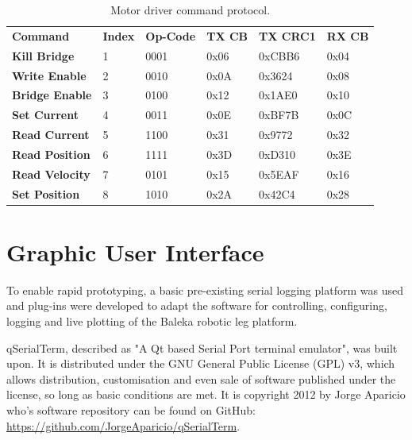 \begin{table}
\centering
\begin{tabular}{llllll}
\textbf{Command}       & \textbf{Index} & \textbf{Op-Code} & \textbf{TX CB} & \textbf{TX CRC1} & \textbf{RX  CB} \\
\textbf{Kill Bridge}   & 1              & 0001             & 0x06           & 0xCBB6           & 0x04            \\
\textbf{Write Enable}  & 2              & 0010             & 0x0A           & 0x3624           & 0x08            \\
\textbf{Bridge Enable} & 3              & 0100             & 0x12           & 0x1AE0           & 0x10            \\
\textbf{Set Current}   & 4              & 0011             & 0x0E           & 0xBF7B           & 0x0C            \\
\textbf{Read Current}  & 5              & 1100             & 0x31           & 0x9772           & 0x32            \\
\textbf{Read Position} & 6              & 1111             & 0x3D           & 0xD310           & 0x3E            \\
\textbf{Read Velocity} & 7              & 0101             & 0x15           & 0x5EAF           & 0x16            \\
\textbf{Set Position}  & 8              & 1010             & 0x2A           & 0x42C4           & 0x28           
\end{tabular}
\caption{Motor driver command protocol.}
\label{tab:motor-driver-protocol}
\end{table}

\section{Graphic User Interface}
\label{chap:Graphic User Interface}

To enable rapid prototyping, a basic pre-existing serial logging platform was used and plug-ins were developed to adapt the software for controlling, configuring, logging and live plotting of the Baleka robotic leg platform. 

qSerialTerm, described as "A Qt based Serial Port terminal emulator", was built upon. It is distributed under the GNU General Public License (GPL) v3, which allows distribution, customisation and even sale of software published under the license, so long as basic conditions are met. It is copyright 2012 by Jorge Aparicio who's software repository can be found on GitHub: \url{https://github.com/JorgeAparicio/qSerialTerm}.

